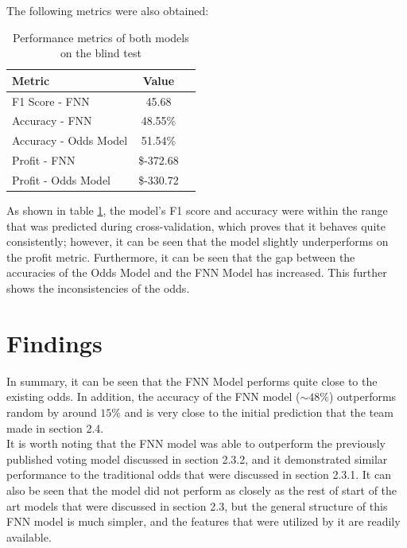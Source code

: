 \documentclass[rgb,listoffigures,listoftables,final]{cam-thesis}
\begin{document}
    The following metrics were also obtained:
    \begin{table}[h]
        \centering
        \caption{Performance metrics of both models on the blind test}
        \vspace{1em}
        \label{tab:blind-test-metrics}
        \begin{tabular}{lcc}
            \hline
            Metric                 & Value     \\
            \hline
            F1 Score - FNN         & 45.68     \\
            Accuracy - FNN         & 48.55\%   \\
            Accuracy - Odds Model  & 51.54\%   \\
            Profit - FNN           & \$-372.68 \\
            Profit - Odds Model    & \$-330.72 \\
            \hline
        \end{tabular}
    \end{table}

    As shown in table \ref{tab:blind-test-metrics}, the model's F1 score and accuracy were within the range that was predicted during cross-validation, which proves that it behaves quite consistently; however, it can be seen that the model slightly underperforms on the profit metric. Furthermore, it can be seen that the gap between the accuracies of the Odds Model and the FNN Model has increased. This further shows the inconsistencies of the odds. 
    
    \section{Findings}
    In summary, it can be seen that the FNN Model performs quite close to the existing odds. In addition, the accuracy of the FNN model ($\sim 48\%$) outperforms random by around $15\%$ and is very close to the initial prediction that the team made in section 2.4.\\

    It is worth noting that the FNN model was able to outperform the previously published voting model discussed in section 2.3.2, and it demonstrated similar performance to the traditional odds that were discussed in section 2.3.1. It can also be seen that the model did not perform as closely as the rest of start of the art models that were discussed in section 2.3, but the general structure of this FNN model is much simpler, and the features that were utilized by it are readily available.\\
\end{document}
